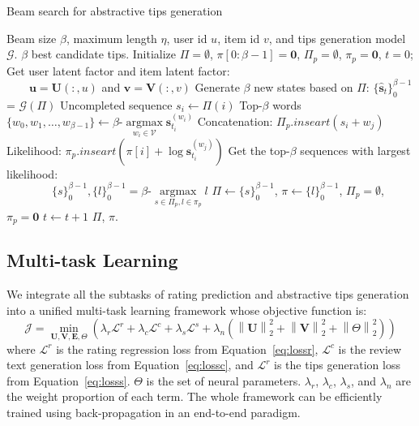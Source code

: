 \documentclass[sigconf]{acmart}
\begin{document}
\begin{algorithm}[!t]
	\caption{Beam search for abstractive tips generation}
	\label{alg:bs}
	\begin{algorithmic}[1]
		\REQUIRE Beam size $\beta$, maximum length $\eta$, user id $u$, item id $v$, and tips generation model $\mathcal{G}$.
		\ENSURE $\beta$ best candidate tips.
		\STATE Initialize $\Pi = \emptyset$, $\pi[0:\beta-1] = \mathbf{0}$,  $\Pi{_p} = \emptyset $,  $\pi_p = \mathbf{0}$, $t = 0$;
		\STATE Get user latent factor and item latent factor:\\
		\ \ \ \ $\mathbf{u}=\mathbf{U}(:,u)$ and $ \mathbf{v}=\mathbf{V}(:,v)$
		\STATE Generate $\beta$ new states based on $\Pi$: $\{ \mathbf{\hat s}_t\}_0^{\beta-1}$ = $\mathcal{G}(\Pi)$
		\STATE Uncompleted sequence $s_i \leftarrow \Pi(i)$
		\STATE Top-$\beta$ words  $\{w_0, w_1, \ldots, w_{\beta-1}\} \leftarrow \beta\textrm{-}\mathop {\arg\max}\limits_{{w_i} \in \mathcal{V}} \mathbf{\hat s}_{t_i}^{ (w_i) }$
		\STATE Concatenation: $\Pi_p.inseart(s_i + w_j) $
		\STATE Likelihood: $\pi_p.inseart(\pi[i] + \log\mathbf{\hat s}_{t_i}^{ (w_j) })$
		\ENDFOR
		\ENDFOR
		\STATE Get the top-$\beta$ sequences with largest likelihood:\\
		\ \ \ \ \ \ \  \ $\{s\}_0^{\beta-1}, \{l\}_0^{\beta-1} = \beta\textrm{-}\mathop{\arg \max }\limits_{{s} \in \Pi_p, l \in \pi_p} l$
		\STATE $\Pi \leftarrow\{s\}_0^{\beta-1}$, $\pi \leftarrow \{l\}_0^{\beta-1}$, $\Pi{_p} = \emptyset $,  $\pi_p = \mathbf{0}$
		\STATE $t \leftarrow t + 1$
		\ENDWHILE
		\RETURN $\Pi$, $\pi$.
	\end{algorithmic}
\end{algorithm}

\subsection{Multi-task Learning}
We integrate all the subtasks of rating prediction and abstractive tips generation into a unified multi-task learning framework whose objective function is:
\begin{equation}
{\mathcal{J}} = \mathop {\min }\limits_{\mathbf{U}, \mathbf{V}, \mathbf{E}, \Theta} (\lambda_r\mathcal{L}^r + \lambda_c\mathcal{L}^c + \lambda_s{\mathcal{L}^s} + \lambda_n(\left\| \mathbf{U}  \right\|_2^2 + \left\| \mathbf{V}  \right\|_2^2 + \left\| \Theta  \right\|_2^2))
\label{eq:obj}
\end{equation}
where $\mathcal{L}^r$ is the rating regression loss from Equation~\ref{eq:lossr},
$\mathcal{L}^c$ is the review text generation loss from Equation~\ref{eq:lossc},
and $\mathcal{L}^r$ is the tips generation loss from Equation~\ref{eq:losss}.
$\Theta$ is the set of neural parameters.
$\lambda_r$, $\lambda_c$, $\lambda_s$, and $\lambda_n$ are the weight proportion of each term.
The whole framework can be efficiently trained using back-propagation in an end-to-end paradigm.
\end{document}
